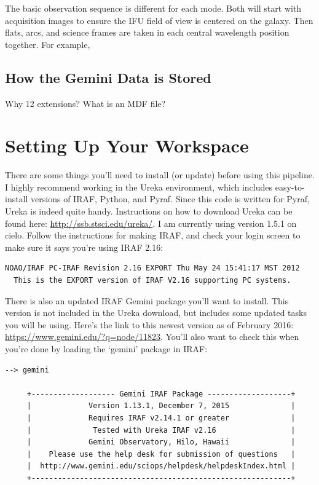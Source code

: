 \documentclass[12pt]{report}
\begin{document}
The basic observation sequence is different for each mode. Both will start with acquisition images to ensure the IFU field of view is centered on the galaxy. Then flats, arcs, and science frames are taken in each central wavelength position together. For example, 

\section{How the Gemini Data is Stored}
Why 12 extensions?
What is an MDF file?



\chapter{Setting Up Your Workspace}

There are some things you'll need to install (or update) before using this pipeline. I highly recommend working in the Ureka environment, which includes easy-to-install versions of IRAF, Python, and Pyraf. Since this code is written for Pyraf, Ureka is indeed quite handy. Instructions on how to download Ureka can be found here: \url{http://ssb.stsci.edu/ureka/}. I am currently using version 1.5.1 on cielo. Follow the instructions for making IRAF, and check your login screen to make sure it says you're using IRAF 2.16:

\begin{verbatim}
NOAO/IRAF PC-IRAF Revision 2.16 EXPORT Thu May 24 15:41:17 MST 2012
  This is the EXPORT version of IRAF V2.16 supporting PC systems.
\end{verbatim}

There is also an updated IRAF Gemini package you'll want to install. This version is not included in the Ureka download, but includes some updated tasks you will be using. Here's the link to this newest version as of February 2016: \url{https://www.gemini.edu/?q=node/11823}. You'll also want to check this when you're done by loading the `gemini' package in IRAF:

\begin{verbatim}
--> gemini

     +------------------- Gemini IRAF Package -------------------+
     |             Version 1.13.1, December 7, 2015              |
     |             Requires IRAF v2.14.1 or greater              |
     |              Tested with Ureka IRAF v2.16                 |
     |             Gemini Observatory, Hilo, Hawaii              |
     |    Please use the help desk for submission of questions   |
     |  http://www.gemini.edu/sciops/helpdesk/helpdeskIndex.html |
     +-----------------------------------------------------------+
\end{verbatim}
\end{document}
